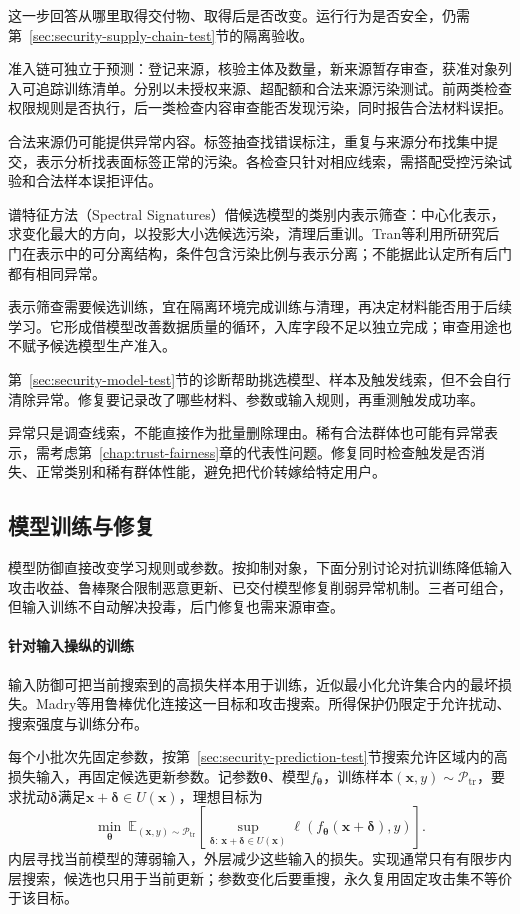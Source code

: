 这一步回答从哪里取得交付物、取得后是否改变。运行行为是否安全，仍需第~\ref{sec:security-supply-chain-test}节的隔离验收。

准入链可独立于预测：登记来源，核验主体及数量，新来源暂存审查，获准对象列入可追踪训练清单。分别以未授权来源、超配额和合法来源污染测试。前两类检查权限规则是否执行，后一类检查内容审查能否发现污染，同时报告合法材料误拒。

合法来源仍可能提供异常内容。标签抽查找错误标注，重复与来源分布找集中提交，表示分析找表面标签正常的污染。各检查只针对相应线索，需搭配受控污染试验和合法样本误拒评估。

谱特征方法（Spectral Signatures）借候选模型的类别内表示筛查：中心化表示，求变化最大的方向，以投影大小选候选污染，清理后重训。Tran等利用所研究后门在表示中的可分离结构，条件包含污染比例与表示分离；不能据此认定所有后门都有相同异常。

表示筛查需要候选训练，宜在隔离环境完成训练与清理，再决定材料能否用于后续学习。它形成借模型改善数据质量的循环，入库字段不足以独立完成；审查用途也不赋予候选模型生产准入。

第~\ref{sec:security-model-test}节的诊断帮助挑选模型、样本及触发线索，但不会自行清除异常。修复要记录改了哪些材料、参数或输入规则，再重测触发成功率。

异常只是调查线索，不能直接作为批量删除理由。稀有合法群体也可能有异常表示，需考虑第~\ref{chap:trust-fairness}章的代表性问题。修复同时检查触发是否消失、正常类别和稀有群体性能，避免把代价转嫁给特定用户。

\subsection{模型训练与修复}
\label{sec:security-prediction-defense}
\label{sec:security-model-defense}

模型防御直接改变学习规则或参数。按抑制对象，下面分别讨论对抗训练降低输入攻击收益、鲁棒聚合限制恶意更新、已交付模型修复削弱异常机制。三者可组合，但输入训练不自动解决投毒，后门修复也需来源审查。

\paragraph{针对输入操纵的训练}

输入防御可把当前搜索到的高损失样本用于训练，近似最小化允许集合内的最坏损失。Madry等用鲁棒优化连接这一目标和攻击搜索。所得保护仍限定于允许扰动、搜索强度与训练分布。

每个小批次先固定参数，按第~\ref{sec:security-prediction-test}节搜索允许区域内的高损失输入，再固定候选更新参数。记参数$\bm\theta$、模型$f_{\bm\theta}$，训练样本$(\bm x,y)\sim\mathcal P_{\mathrm{tr}}$，要求扰动$\bm\delta$满足$\bm x+\bm\delta\in U(\bm x)$，理想目标为
\begin{equation}
 \min_{\bm\theta}\ \mathbb E_{(\bm x,y)\sim\mathcal P_{\mathrm{tr}}}
 \left[\sup_{\bm\delta:\,\bm x+\bm\delta\in U(\bm x)}
  \ell(f_{\bm\theta}(\bm x+\bm\delta),y)\right].
 \label{eq:security-adversarial-training}
\end{equation}
内层寻找当前模型的薄弱输入，外层减少这些输入的损失。实现通常只有有限步内层搜索，候选也只用于当前更新；参数变化后要重搜，永久复用固定攻击集不等价于该目标。

